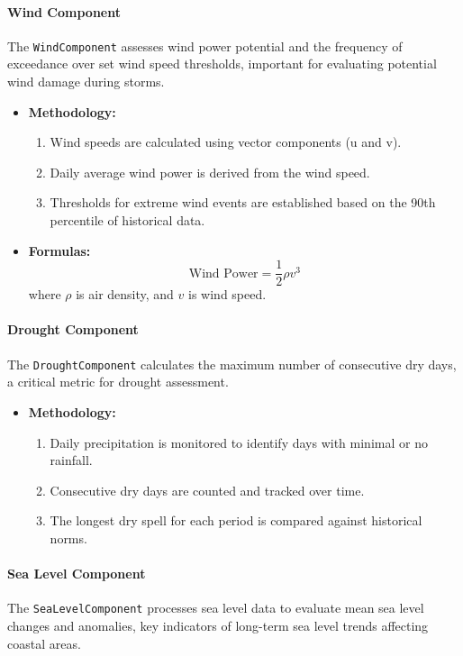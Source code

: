 \documentclass[a4paper,12pt]{article}
\begin{document}
\paragraph{Wind Component}
The \texttt{WindComponent} assesses wind power potential and the frequency of exceedance over set wind speed thresholds, important for evaluating potential wind damage during storms.

\begin{itemize}
    \item \textbf{Methodology:}
    \begin{enumerate}
        \item Wind speeds are calculated using vector components (u and v).
        \item Daily average wind power is derived from the wind speed.
        \item Thresholds for extreme wind events are established based on the 90th percentile of historical data.
    \end{enumerate}
    \item \textbf{Formulas:}
    \[
    \text{Wind Power} = \frac{1}{2} \rho v^3
    \]
    where $\rho$ is air density, and $v$ is wind speed.
\end{itemize}

\paragraph{Drought Component}
The \texttt{DroughtComponent} calculates the maximum number of consecutive dry days, a critical metric for drought assessment.

\begin{itemize}
    \item \textbf{Methodology:}
    \begin{enumerate}
        \item Daily precipitation is monitored to identify days with minimal or no rainfall.
        \item Consecutive dry days are counted and tracked over time.
        \item The longest dry spell for each period is compared against historical norms.
    \end{enumerate}
\end{itemize}

\paragraph{Sea Level Component}
The \texttt{SeaLevelComponent} processes sea level data to evaluate mean sea level changes and anomalies, key indicators of long-term sea level trends affecting coastal areas.
\end{document}
